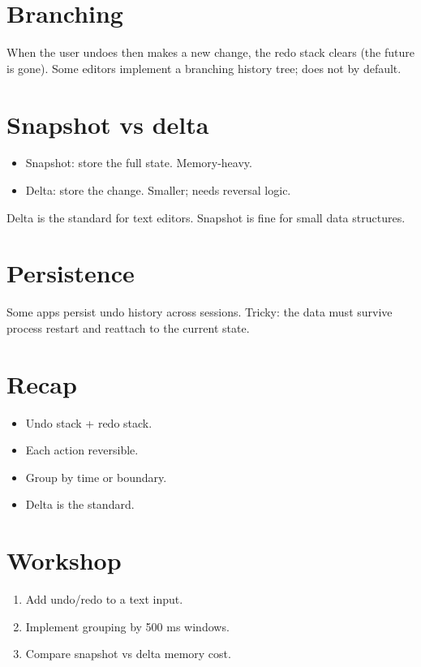 \section{Branching}

When the user undoes then makes a new change, the redo stack
clears (the future is gone). Some editors implement a
branching history tree; \maya{} does not by default.

\section{Snapshot vs delta}

\begin{itemize}[leftmargin=*]
  \item Snapshot: store the full state. Memory-heavy.
  \item Delta: store the change. Smaller; needs reversal
    logic.
\end{itemize}

Delta is the standard for text editors. Snapshot is fine
for small data structures.

\section{Persistence}

Some apps persist undo history across sessions. Tricky:
the data must survive process restart and reattach to the
current state.

\section{Recap}

\begin{recap}
\begin{itemize}[leftmargin=*]
  \item Undo stack + redo stack.
  \item Each action reversible.
  \item Group by time or boundary.
  \item Delta is the standard.
\end{itemize}
\end{recap}

\section*{Workshop}

\begin{enumerate}[leftmargin=*]
  \item Add undo/redo to a text input.
  \item Implement grouping by 500 ms windows.
  \item Compare snapshot vs delta memory cost.
\end{enumerate}
